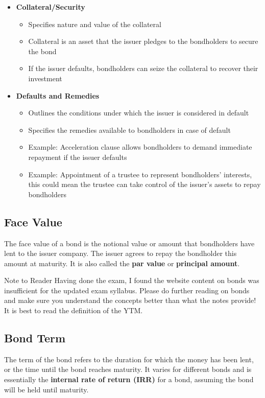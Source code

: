 \begin{itemize}
\begin{itemize}
    \end{itemize}
    \item \textbf{Collateral/Security}
    \begin{itemize}
        \item Specifies nature and value of the collateral
        \item Collateral is an asset that the issuer pledges to the bondholders to secure the bond
        \item If the issuer defaults, bondholders can seize the collateral to recover their investment
    \end{itemize}
    \item \textbf{Defaults and Remedies}
    \begin{itemize}
        \item Outlines the conditions under which the issuer is considered in default
        \item Specifies the remedies available to bondholders in case of default
        \item Example: Acceleration clause allows bondholders to demand immediate repayment if the issuer defaults
        \item Example: Appointment of a trustee to represent bondholders' interests, this could mean the trustee can take control of the issuer's assets to repay bondholders
    \end{itemize}
\end{itemize}

\subsection*{Face Value}
The face value of a bond is the notional value or amount that bondholders have lent to the issuer company. The issuer agrees to repay the bondholder this amount at maturity. It is also called the \textbf{par value} or \textbf{principal amount}.


\begin{commentbox}{Note to Reader}
    Having done the exam, I found the website content on bonds was insufficient for the updated exam syllabus. Please do further reading on bonds and make sure you understand the concepts better than what the notes provide! It is best to read the definition of the YTM.
\end{commentbox}


\subsection*{Bond Term}
The term of the bond refers to the duration for which the money has been lent, or the time until the bond reaches maturity. It varies for different bonds and is essentially the \textbf{internal rate of return (IRR)} for a bond, assuming the bond will be held until maturity.



